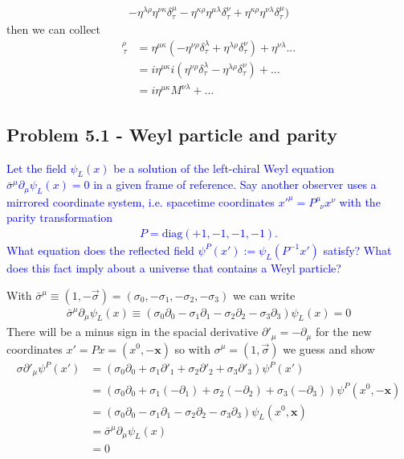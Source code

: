 \documentclass[../main.tex]{subfiles}
\begin{document}
\begin{enumerate}[(a)]
\begin{align}
-\eta^{\lambda\rho}\eta^{\nu\kappa}\delta^\mu_\tau
-\eta^{\kappa\rho}\eta^{\mu\lambda}\delta^\nu_\tau
+\eta^{\kappa\rho}\eta^{\nu\lambda}\delta^\mu_\tau
)
\end{align}
then we can collect
\begin{align}
[M^{\mu\nu},M^{\lambda\kappa}]^\rho_{\,\tau}&=
\eta^{\mu\kappa}(-\eta^{\nu\rho}\delta^\lambda_\tau+\eta^{\lambda\rho}\delta^\nu_\tau)+\eta^{\nu\lambda}...\\
&=i\eta^{\mu\kappa}i(\eta^{\nu\rho}\delta^\lambda_\tau-\eta^{\lambda\rho}\delta^\nu_\tau)+...\\
&=i\eta^{\mu\kappa}M^{\nu\lambda}+...
\end{align}

\end{enumerate}

\subsection{Problem 5.1 - Weyl particle and parity}
\textcolor{blue}{
Let the field $\psi_L(x)$ be a solution of the left-chiral Weyl equation $\bar{\sigma}^\mu\partial_\mu\psi_L(x) = 0$ in a
given frame of reference. Say another observer uses a mirrored coordinate system, i.e. spacetime coordinates $x'^\mu = P^\mu_{\;\;\nu}x^\nu$ with the parity transformation
\begin{align}
P = \text{diag}(+1,-1,-1,-1).
\end{align}
What equation does the reflected field $\psi^P(x') := \psi_L(P^{-1}x')$ satisfy? What does this fact imply about a universe that contains a Weyl particle?
}

With $\bar{\sigma}^\mu\equiv(1,-\vec{\sigma})=(\sigma_0,-\sigma_1,-\sigma_2,-\sigma_3)$ we can write
\begin{align}
\bar{\sigma}^\mu\partial_\mu\psi_L(x)
\equiv(\sigma_0\partial_0-\sigma_1\partial_1-\sigma_2\partial_2-\sigma_3\partial_3)\psi_L(x)=0
\end{align}
There will be a minus sign in the spacial derivative  $\partial'_\mu=-\partial_\mu$ for the new coordinates $x'=Px=(x^0,-\mathbf{x})$ so with $\sigma^\mu=(1,\vec{\sigma})$ we guess and show
\begin{align}
\sigma\partial'_\mu\psi^P(x')
&=\left(\sigma_0\partial_0+\sigma_1\partial'_1+\sigma_2\partial'_2+\sigma_3\partial'_3\right)\psi^P(x')\\
&=\left(\sigma_0\partial_0+\sigma_1(-\partial_1)+\sigma_2(-\partial_2)+\sigma_3(-\partial_3)\right)\psi^P(x^0,-\mathbf{x})\\
&=\left(\sigma_0\partial_0-\sigma_1\partial_1-\sigma_2\partial_2-\sigma_3\partial_3\right)\psi_L(x^0,\mathbf{x})\\
&=\bar{\sigma}^\mu\partial_\mu\psi_L(x)\\
&=0
\end{align}
\end{document}
